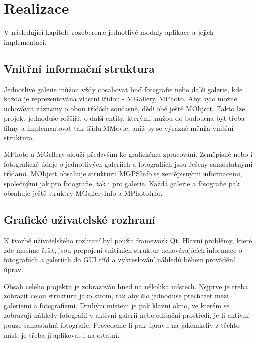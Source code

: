 \documentclass[11pt,twoside,a4paper]{book}
\begin{document}
\chapter{Realizace}
\noindent
V následující kapitole rozebereme jednotlivé moduly aplikace a jejich implementaci.

\section{Vnitřní informační struktura}
\noindent
Jednotlivé galerie můžou vždy obsahovat buď fotografie nebo další galerie, kde každá je reprezentována vlastní třídou - MGallery, MPhoto. Aby bylo možné uchovávat záznamy o obou třídách současně, dědí obě ještě MObject. Takto lze projekt jednoduše rožšířit o další entity, kterými můžou do budoucna být třeba filmy a implementovat tak třídu MMovie, aniž by se výrazně měnila vnitřní struktura.

MPhoto a MGallery slouží především ke grafickému zpracování. Zeměpisné nebo i fotografické údaje o jednotlivých galeriích a fotografiích jsou řešeny samostatnými třídami. MObject obsahuje strukturu MGPSInfo se zeměpisnými informacemi, společnými jak pro fotografie, tak i pro galerie. Každá galerie a fotografie pak obsahuje ještě struktry MGalleryInfo a MPhotoInfo.

\section{Grafické uživatelské rozhraní}
\noindent
K tvorbě uživatelského rozhraní byl použit framework Qt. Hlavní problémy, které zde musíme řešit, jsou propojení vnitřních struktur uchovávajících informace o fotografiích a galeriích do GUI tříd a vykreslování náhledů během provádění úprav.

\indent
Obsah celého projektu je zobrazován hned na několika místech. Nejprve je třeba zobrazit celou strukturu jako strom, tak aby šlo jednoduše přecházet mezi galeriemi a fotografiemi. Druhým místem je pak hlavní okno, ve kterém se zobrazují náhledy fotografií v aktivní galerii nebo editační prostředí, je-li aktivní pouze samostatná fotografie. Provedeme-li pak úpravu na jakémkoliv z těchto míst, je třeba ji aplikovat i na ostatní.
\end{document}
